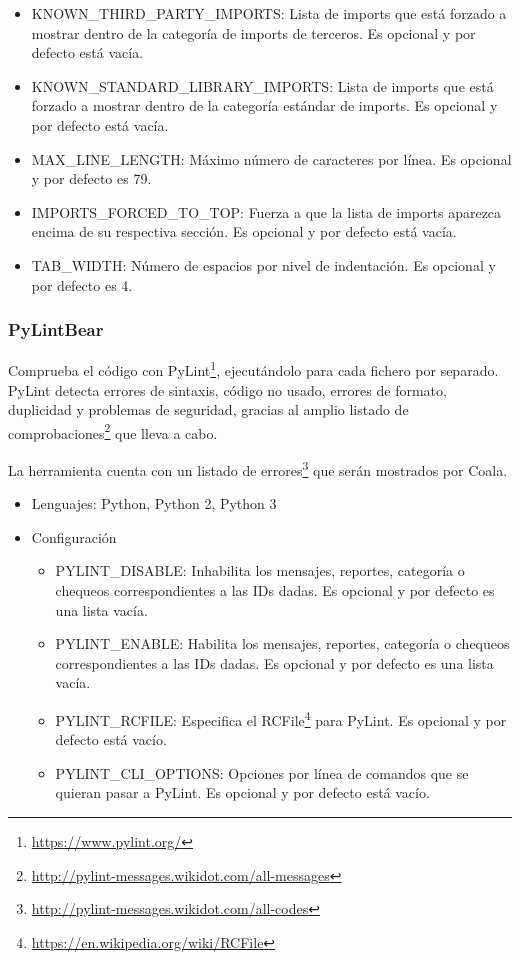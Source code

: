 \documentclass[a4paper, 12pt]{book}
\begin{document}
\begin{itemize}
\begin{itemize}
          \item KNOWN\_THIRD\_PARTY\_IMPORTS: Lista de imports que está forzado a mostrar dentro de la categoría de imports de terceros. Es opcional y por defecto está vacía.
          \item KNOWN\_STANDARD\_LIBRARY\_IMPORTS: Lista de imports que está forzado a mostrar dentro de la categoría estándar de imports. Es opcional y por defecto está vacía.
          \item MAX\_LINE\_LENGTH: Máximo número de caracteres por línea. Es opcional y por defecto es 79.
          \item IMPORTS\_FORCED\_TO\_TOP: Fuerza a que la lista de imports aparezca encima de su respectiva sección. Es opcional y por defecto está vacía.
          \item TAB\_WIDTH: Número de espacios por nivel de indentación. Es opcional y por defecto es 4.
    \end{itemize}
\end{itemize}

\subsubsection{PyLintBear}
\label{sec:seccion1.2.10}
Comprueba el código con PyLint\footnote{\url{https://www.pylint.org/}}, ejecutándolo para cada fichero por separado. PyLint detecta errores de sintaxis, código no usado, errores de formato, duplicidad y problemas de seguridad, gracias al amplio listado de comprobaciones\footnote{\url{http://pylint-messages.wikidot.com/all-messages}} que lleva a cabo.

La herramienta cuenta con un listado de errores\footnote{\url{http://pylint-messages.wikidot.com/all-codes}} que serán mostrados por Coala.

\begin{itemize}
  \item Lenguajes: Python, Python 2, Python 3
  \item Configuración
    \begin{itemize}
          \item PYLINT\_DISABLE: Inhabilita los mensajes, reportes, categoría o chequeos correspondientes a las IDs dadas. Es opcional y por defecto es una lista vacía.
          \item PYLINT\_ENABLE: Habilita los mensajes, reportes, categoría o chequeos correspondientes a las IDs dadas. Es opcional y por defecto es una lista vacía.
          \item PYLINT\_RCFILE: Especifica el RCFile\footnote{\url{https://en.wikipedia.org/wiki/RCFile}} para PyLint. Es opcional y por defecto está vacío.
          \item PYLINT\_CLI\_OPTIONS: Opciones por línea de comandos que se quieran pasar a PyLint. Es opcional y por defecto está vacío.
    \end{itemize}
\end{itemize}
\end{document}
